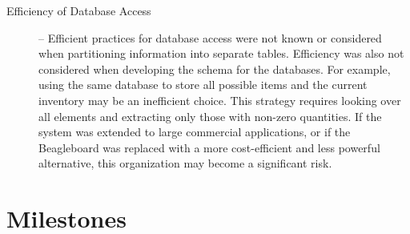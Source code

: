 \documentclass[11pt]{article} %
\begin{document}
\begin{description}
\item[Efficiency of Database Access] -- Efficient practices for database access were not known or considered when partitioning information into separate tables. Efficiency was also not considered when developing the schema for the databases. For example, using the same database to store all possible items and the current inventory may be an inefficient choice. This strategy requires looking over all elements and extracting only those with non-zero quantities. If the system was extended to large commercial applications, or if the Beagleboard was replaced with a more cost-efficient and less powerful alternative, this organization may become a significant risk.
\end{description}
\pagebreak
\section{Milestones}
\end{document}

